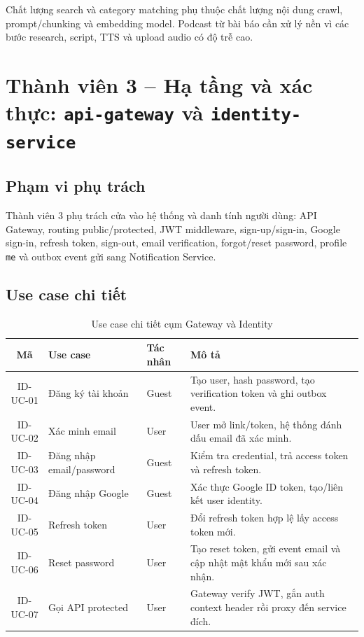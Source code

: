 \documentclass[14pt,a4paper,oneside]{extreport}
\begin{document}
Chất lượng search và category matching phụ thuộc chất lượng nội dung crawl, prompt/chunking và embedding model. Podcast từ bài báo cần xử lý nền vì các bước research, script, TTS và upload audio có độ trễ cao.

\section{Thành viên 3 -- Hạ tầng và xác thực: \texttt{api-gateway} và \texttt{identity-service}}
\label{sec:phase3-identity-gateway}

\subsection{Phạm vi phụ trách}

Thành viên 3 phụ trách cửa vào hệ thống và danh tính người dùng: API Gateway, routing public/protected, JWT middleware, sign-up/sign-in, Google sign-in, refresh token, sign-out, email verification, forgot/reset password, profile \texttt{me} và outbox event gửi sang Notification Service.

\subsection{Use case chi tiết}

\begin{table}[H]
\centering
\caption{Use case chi tiết cụm Gateway và Identity}
\label{tab:uc-identity-gateway}
\renewcommand{\arraystretch}{1.3}
\small
\begin{tabularx}{\textwidth}{|c|l|l|X|}
\hline
\textbf{Mã} & \textbf{Use case} & \textbf{Tác nhân} & \textbf{Mô tả} \\
\hline
ID-UC-01 & Đăng ký tài khoản & Guest & Tạo user, hash password, tạo verification token và ghi outbox event. \\
\hline
ID-UC-02 & Xác minh email & User & User mở link/token, hệ thống đánh dấu email đã xác minh. \\
\hline
ID-UC-03 & Đăng nhập email/password & Guest & Kiểm tra credential, trả access token và refresh token. \\
\hline
ID-UC-04 & Đăng nhập Google & Guest & Xác thực Google ID token, tạo/liên kết user identity. \\
\hline
ID-UC-05 & Refresh token & User & Đổi refresh token hợp lệ lấy access token mới. \\
\hline
ID-UC-06 & Reset password & User & Tạo reset token, gửi event email và cập nhật mật khẩu mới sau xác nhận. \\
\hline
ID-UC-07 & Gọi API protected & User & Gateway verify JWT, gắn auth context header rồi proxy đến service đích. \\
\hline
\end{tabularx}
\end{table}
\end{document}
